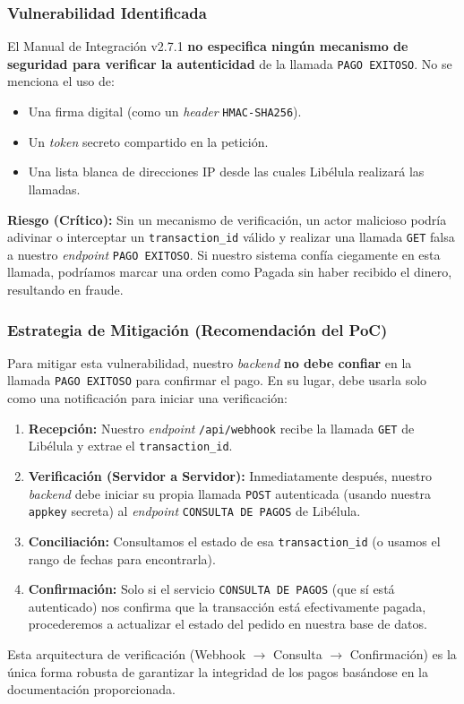         \subsubsection{Vulnerabilidad Identificada}
            El Manual de Integración v2.7.1 \textbf{no especifica ningún mecanismo de seguridad para verificar la autenticidad} 
            de la llamada \texttt{PAGO EXITOSO}. No se menciona el uso de:
            \begin{itemize}
                \item Una firma digital (como un \emph{header} \texttt{HMAC-SHA256}).
                \item Un \emph{token} secreto compartido en la petición.
                \item Una lista blanca de direcciones IP desde las cuales Libélula realizará las llamadas.
            \end{itemize}

            \noindent
            \textbf{Riesgo (Crítico):} Sin un mecanismo de verificación, un actor malicioso podría adivinar o interceptar un 
            \texttt{transaction\_id} válido y realizar una llamada \texttt{GET} falsa a nuestro \emph{endpoint} \texttt{PAGO 
            EXITOSO}. Si nuestro sistema confía ciegamente en esta llamada, podríamos marcar una orden como Pagada sin haber 
            recibido el dinero, resultando en fraude.\par

        \subsubsection{Estrategia de Mitigación (Recomendación del PoC)}
            Para mitigar esta vulnerabilidad, nuestro \emph{backend} \textbf{no debe confiar} en la llamada \texttt{PAGO EXITOSO} 
            para confirmar el pago. En su lugar, debe usarla solo como una notificación para iniciar una verificación:

            \begin{enumerate}
                \item \textbf{Recepción:} Nuestro \emph{endpoint} \texttt{/api/webhook} recibe la llamada \texttt{GET} de Libélula y extrae el \texttt{transaction\_id}.
                \item \textbf{Verificación (Servidor a Servidor):} Inmediatamente después, nuestro \emph{backend} debe iniciar su propia llamada \texttt{POST} autenticada (usando nuestra \texttt{appkey} secreta) al \emph{endpoint} \texttt{CONSULTA DE PAGOS} de Libélula.
                \item \textbf{Conciliación:} Consultamos el estado de esa \texttt{transaction\_id} (o usamos el rango de fechas para encontrarla).
                \item \textbf{Confirmación:} Solo si el servicio \texttt{CONSULTA DE PAGOS} (que sí está autenticado) nos confirma que la transacción está efectivamente pagada, procederemos a actualizar el estado del pedido en nuestra base de datos.
            \end{enumerate}

            Esta arquitectura de verificación (Webhook $\rightarrow$ Consulta $\rightarrow$ Confirmación) es la única forma robusta de garantizar la integridad de los pagos basándose en la documentación proporcionada.